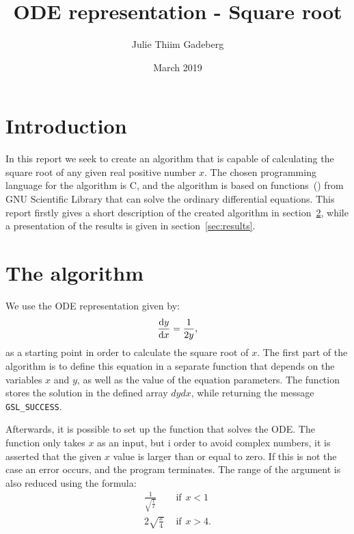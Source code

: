 \documentclass[12pt, twocolumn]{article}
\title{ODE representation - Square root}
\author{Julie Thiim Gadeberg}
\date{March 2019}
\begin{document}
\maketitle

\section{Introduction}

In this report we seek to create an algorithm that is capable of calculating the square root of any given real positive number $x$. The chosen programming language for the algorithm is C, and the algorithm is based on functions~(\cite{gsl}) from GNU Scientific Library that can solve the ordinary differential equations. This report firstly gives a short description of the created algorithm in section~\ref{sec:algorithm}, while a presentation of the results is given in section~\ref{sec:results}.

\section{The algorithm} \label{sec:algorithm}

We use the ODE representation given by:
\begin{equation}
    \frac{\textup{d}y}{\textup{d}x} = \frac{1}{2y},
\end{equation}
as a starting point in order to calculate the square root of $x$. The first part of the algorithm is to define this equation in a separate function that depends on the variables $x$ and $y$, as well as the value of the equation parameters. The function stores the solution in the defined array $dydx$, while returning the message \texttt{GSL\_SUCCESS}.

Afterwards, it is possible to set up the function that solves the ODE. The function only takes $x$ as an input, but i order to avoid complex numbers, it is asserted that the given $x$ value is larger than or equal to zero. If this is not the case an error occurs, and the program terminates. The range of the argument is also reduced using the formula:
\begin{align}
    \frac{1}{\sqrt{\frac{1}{x}}} \hspace{5pt} &\textrm{if} \hspace{5pt} x < 1\\
    2\sqrt{\frac{x}{4}} \hspace{5pt} &\textrm{if} \hspace{5pt} x > 4.
\end{align}
\end{document}
